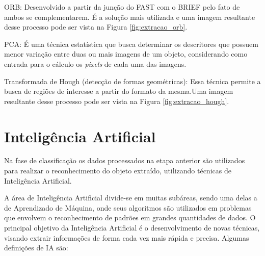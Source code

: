 \documentclass[12pt,oneside,a4paper,chapter=TITLE,section=TITLE,sumario
		=tradicional]{abntex2}
\begin{document}
\begin{lista}
			\item ORB: Desenvolvido a partir da junção do FAST com o BRIEF pelo fato de ambos se complementarem. É a solução mais utilizada e uma imagem resultante desse processo pode ser vista na Figura \ref{fig:extracao_orb}.
			
			\begin{figure}[h]
			\end{figure}
			
			\item PCA: É uma técnica estatística que busca determinar os descritores que possuem menor variação entre duas ou mais imagens de um objeto, considerando como entrada para o cálculo os \textit{pixels} de cada uma das imagens.
						
			\item Transformada de Hough (detecção de formas geométricas): Essa técnica permite a busca de regiões de interesse a partir do formato da mesma.\hspace{0.1cm}Uma imagem resultante desse processo pode ser vista na Figura \ref{fig:extracao_hough}.
			
			\begin{figure}[H]
			\end{figure}
		\end{lista}
		
		\section{Inteligência Artificial}
		Na fase de classificação os dados processados na etapa anterior são utilizados para realizar o reconhecimento do objeto extraído, utilizando técnicas de Inteligência Artificial.
		
		A área de Inteligência Artificial divide-se em muitas subáreas, sendo uma delas a de Aprendizado de Máquina, onde seus algoritmos são utilizados em problemas que envolvem o reconhecimento de padrões em grandes quantidades de dados. O principal objetivo da Inteligência Artificial é o desenvolvimento de novas técnicas, visando extrair informações de forma cada vez mais rápida e precisa. Algumas definições de IA são:
		
\end{document}
